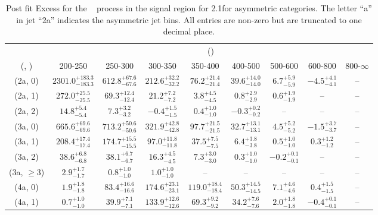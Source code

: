 \begin{table}[h!]
\tiny
\centering
\caption{Post fit Excess for the \zInv~ process in the signal region for 2.1\ifb for asymmetric categories. The letter ``a'' in jet \eg ``2a''  indicates the asymmetric jet bins. All entries are non-zero but are truncated to one decimal place.\label{tab:excessseppost_sig_zinv_asym}}
\begin{tabular}
{ccccccccc}
	\hline\hline
	& \multicolumn{8}{c}{\scalht (\gev)} \\ 
	 (\njet,  \nb) & 200-250 & 250-300 & 300-350 & 350-400 & 400-500 & 500-600 & 600-800 & 800-$\infty$ \\ [0.8ex] 
\hline
	(2a, 0) & $2301.0^{+ 183.3 }_{- 183.3 }$ & $612.8^{+ 67.6 }_{- 67.6 }$ & $212.6^{+ 32.2 }_{- 32.2 }$ & $76.2^{+ 21.4 }_{- 21.4 }$ & $39.6^{+ 14.0 }_{- 14.0 }$ & $6.7^{+ 5.9 }_{- 5.9 }$ & $-4.5^{+ 4.1 }_{- 4.1 }$ & -- \\[0.5ex] 
	(2a, 1) & $272.0^{+ 25.5 }_{- 25.5 }$ & $69.3^{+ 12.4 }_{- 12.4 }$ & $21.2^{+ 7.2 }_{- 7.2 }$ & $3.8^{+ 4.5 }_{- 4.5 }$ & $0.8^{+ 2.9 }_{- 2.9 }$ & $0.6^{+ 1.9 }_{- 1.9 }$ & -- & -- \\[0.5ex] 
	(2a, 2) & $14.8^{+ 5.4 }_{- 5.4 }$ & $7.3^{+ 3.2 }_{- 3.2 }$ & $-0.4^{+ 1.5 }_{- 1.5 }$ & $0.4^{+ 1.0 }_{- 1.0 }$ & $-0.3^{+ 0.2 }_{- 0.2 }$ & -- & -- & -- \\[0.5ex] 
	(3a, 0) & $665.6^{+ 69.6 }_{- 69.6 }$ & $713.2^{+ 50.6 }_{- 50.6 }$ & $321.9^{+ 42.8 }_{- 42.8 }$ & $97.7^{+ 21.5 }_{- 21.5 }$ & $32.7^{+ 13.1 }_{- 13.1 }$ & $4.5^{+ 5.2 }_{- 5.2 }$ & $-1.5^{+ 3.7 }_{- 3.7 }$ & -- \\[0.5ex] 
	(3a, 1) & $208.4^{+ 17.4 }_{- 17.4 }$ & $174.7^{+ 15.5 }_{- 15.5 }$ & $97.0^{+ 11.8 }_{- 11.8 }$ & $37.5^{+ 7.5 }_{- 7.5 }$ & $6.4^{+ 3.8 }_{- 3.8 }$ & $0.5^{+ 1.0 }_{- 1.0 }$ & $0.3^{+ 1.2 }_{- 1.2 }$ & -- \\[0.5ex] 
	(3a, 2) & $38.6^{+ 6.8 }_{- 6.8 }$ & $38.1^{+ 6.7 }_{- 6.7 }$ & $16.3^{+ 4.5 }_{- 4.5 }$ & $7.3^{+ 3.0 }_{- 3.0 }$ & $0.3^{+ 1.0 }_{- 1.0 }$ & $-0.2^{+ 0.1 }_{- 0.1 }$ & -- & -- \\[0.5ex] 
	(3a, $\ge3$) & $2.9^{+ 1.7 }_{- 1.7 }$ & $0.8^{+ 1.0 }_{- 1.0 }$ & $1.0^{+ 1.0 }_{- 1.0 }$ & -- & -- & -- & -- & -- \\[0.5ex] 
	(4a, 0) & $1.9^{+ 1.8 }_{- 1.8 }$ & $83.4^{+ 16.6 }_{- 16.6 }$ & $174.6^{+ 23.1 }_{- 23.1 }$ & $119.0^{+ 18.4 }_{- 18.4 }$ & $50.3^{+ 14.5 }_{- 14.5 }$ & $7.1^{+ 4.6 }_{- 4.6 }$ & $0.4^{+ 1.5 }_{- 1.5 }$ & -- \\[0.5ex] 
	(4a, 1) & $0.7^{+ 1.0 }_{- 1.0 }$ & $39.9^{+ 7.1 }_{- 7.1 }$ & $133.9^{+ 12.6 }_{- 12.6 }$ & $69.3^{+ 9.2 }_{- 9.2 }$ & $34.2^{+ 7.6 }_{- 7.6 }$ & $2.0^{+ 1.8 }_{- 1.8 }$ & $-0.4^{+ 0.1 }_{- 0.1 }$ & -- \\[0.5ex] 

\end{tabular}
\end{table}
